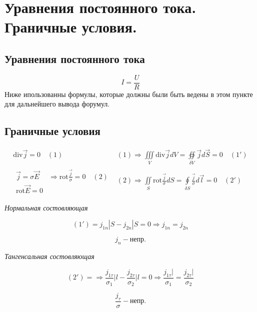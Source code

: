 \newpage

\section{Уравнения постоянного тока. Граничные условия.}
 
\subsection*{Уравнения постоянного тока}



\[I=\frac{U}{R} \]
Ниже ипользованны формулы, которые должны были быть ведены в этом пункте для дальнейшего вывода форумул.
\subsection*{Граничные условия}
\[
\begin{array}{l|l}
    \mathrm{div}\vec{j}=0 \quad (1)& (1)\Rightarrow\underset{V}{\iiint}\mathrm{div}\vec{j}dV=\underset{\delta V}{\oiint}\vec{j}d\vec{S}=0 \quad (1') \\
    
    \begin{array}{l|l}
        \vec{j}=\sigma\vec{E} &\Rightarrow \mathrm{rot} \frac{\vec{j}}{\sigma}=0 \quad (2)  \\
        \mathrm{rot}\vec{E}=0 
    \end{array}    & (2)\Rightarrow \underset{S}{ \iint}\mathrm{rot} \frac{\vec{j}}{\sigma}dS=\underset{\delta S}{\oint} \frac{\vec{j}}{\sigma} d\vec{l}=0\quad (2')  
    
\end{array}
\]

\textit{Нормальная состовляющая}


\[(1')=j_{1n}|S-j_{2n}|S=0\Rightarrow j_{1n}=j_{2n} \]

\[\boxed{j_n-\text{непр.}}\]

\textit{Тангенсальная состовляющая}


\[(2')=\Rightarrow \frac{j_{1\tau}}{\sigma_1}\bigg|l-\frac{j_{2\tau}}{\sigma_2}\bigg|l=0\Rightarrow \frac{j_{1\tau}|}{\sigma_1}=\frac{j_{2\tau}|}{\sigma_2}\]

\[\boxed{\frac{j_{\tau}}{\sigma} -\text{непр.}}\]
